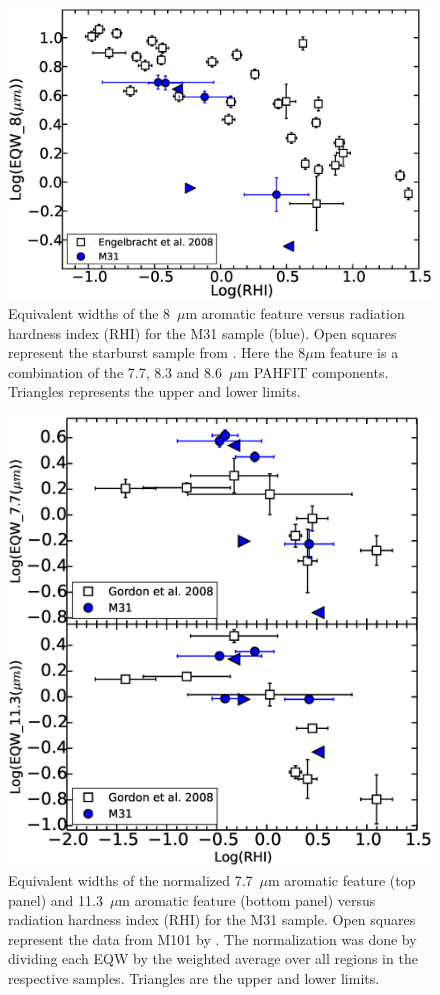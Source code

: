 \begin{figure}
\centering
\includegraphics[scale=0.25]{./englvsmy.eps}
\caption{Equivalent widths of the 8~$\mu$m aromatic feature versus radiation hardness index (RHI) for the M31 sample (blue). 
Open squares represent the starburst sample from \citet{Engelbracht_2008}. 
Here the 8$\mu$m feature is a combination of the 7.7, 8.3 and 8.6~$\mu$m PAHFIT components. 
Triangles represents the upper and lower limits.}\label{II}
\label{englII}
\end{figure}

\begin{figure}
\centering
\includegraphics[scale=0.30]{./Gordvsmy.eps}
\caption{Equivalent widths of the normalized 7.7~$\mu$m aromatic feature (top panel) and 11.3~$\mu$m aromatic feature (bottom panel) versus 
radiation hardness index (RHI) for the M31 sample. Open squares represent the data from M101 by \citet{Gordon:2008lr}. 
The normalization was done by dividing each EQW by the weighted average over all regions in the respective samples. Triangles are the upper and lower limits.}
\label{gordII}
\end{figure}

